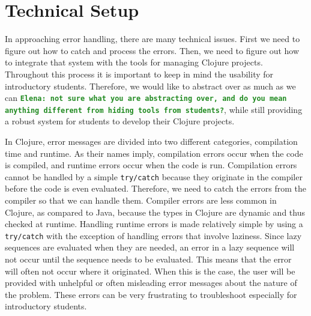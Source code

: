 \documentclass[12pt]{article}
\newcommand{\comment}[1]{{\bf \tt  {#1}}}
\newcommand{\emcomment}[1]{\textcolor{ForestGreen}{\comment{Elena: {#1}}}}
\begin{document}
\section{Technical Setup}\label{sec:technical}
In approaching error handling, there are many technical issues. First we need to figure out how to catch and process the errors. Then, we need to figure out how to integrate that system with the tools for managing Clojure projects. Throughout this process it is important to keep in mind the usability for introductory students. Therefore, we would like to abstract over as much as we can \emcomment{not sure what you are abstracting over, and do you mean anything different from hiding tools from students?}, while still providing a robust system for students to develop their Clojure projects.

In Clojure, error messages are divided into two different categories, compilation time and runtime. As their names imply, compilation errors occur when the code is compiled, and runtime errors occur when the code is run.
Compilation errors cannot be handled by a simple {\tt try/catch} because they originate in the compiler before the code is even evaluated. Therefore, we need to catch the errors from the compiler so that we can handle them. Compiler errors are less common in Clojure, as compared to Java, because the types in Clojure are dynamic and thus checked at runtime.
Handling runtime errors is made relatively simple by using a {\tt try/catch}  with the exception of handling errors that involve laziness. Since lazy sequences are evaluated when they are needed, an error in a lazy sequence will not occur until the sequence needs to be evaluated. This means that the error will often not occur where it originated. When this is the case, the user will be provided with unhelpful or often misleading error messages about the nature of the problem. These errors can be very frustrating to troubleshoot especially for introductory students. %
\end{document}
